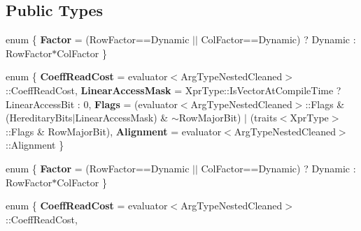 \subsection*{Public Types}
\begin{DoxyCompactItemize}
\item 
\mbox{\label{struct_eigen_1_1internal_1_1unary__evaluator_3_01_replicate_3_01_arg_type_00_01_row_factor_00_01_col_factor_01_4_01_4_aa991ca803e58e59a8f0629390ca7fd95}} 
enum \{ {\bfseries Factor} = (Row\+Factor==Dynamic $\vert$$\vert$ Col\+Factor==Dynamic) ? Dynamic \+: Row\+Factor$\ast$\+Col\+Factor
 \}
\item 
\mbox{\label{struct_eigen_1_1internal_1_1unary__evaluator_3_01_replicate_3_01_arg_type_00_01_row_factor_00_01_col_factor_01_4_01_4_ad737fe53487809fb59ddb62f3082abc9}} 
enum \{ {\bfseries Coeff\+Read\+Cost} = evaluator$<$Arg\+Type\+Nested\+Cleaned$>$\+:\+:Coeff\+Read\+Cost, 
{\bfseries Linear\+Access\+Mask} = Xpr\+Type\+:\+:Is\+Vector\+At\+Compile\+Time ? Linear\+Access\+Bit \+: 0, 
{\bfseries Flags} = (evaluator$<$Arg\+Type\+Nested\+Cleaned$>$\+:\+:Flags \& (Hereditary\+Bits$\vert$\+Linear\+Access\+Mask) \& $\sim$\+Row\+Major\+Bit) $\vert$ (traits$<$Xpr\+Type$>$\+:\+:Flags \& Row\+Major\+Bit), 
{\bfseries Alignment} = evaluator$<$Arg\+Type\+Nested\+Cleaned$>$\+:\+:Alignment
 \}
\item 
\mbox{\label{struct_eigen_1_1internal_1_1unary__evaluator_3_01_replicate_3_01_arg_type_00_01_row_factor_00_01_col_factor_01_4_01_4_a886f9b555b4c22d81af096ca3b1b6674}} 
enum \{ {\bfseries Factor} = (Row\+Factor==Dynamic $\vert$$\vert$ Col\+Factor==Dynamic) ? Dynamic \+: Row\+Factor$\ast$\+Col\+Factor
 \}
\item 
\mbox{\label{struct_eigen_1_1internal_1_1unary__evaluator_3_01_replicate_3_01_arg_type_00_01_row_factor_00_01_col_factor_01_4_01_4_a20e18b40004817dc3a705271b953e154}} 
enum \{ {\bfseries Coeff\+Read\+Cost} = evaluator$<$Arg\+Type\+Nested\+Cleaned$>$\+:\+:Coeff\+Read\+Cost, 

\end{DoxyCompactItemize}

